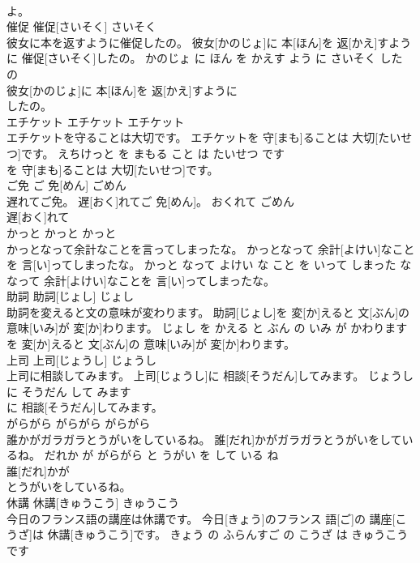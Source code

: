 \documentclass[8pt]{extreport}
\begin{document}
\begin{CJK}{UTF8}{min}
\\	よ。			
\\	催促	催促[さいそく]	さいそく	
\\	彼女に本を返すように催促したの。	彼女[かのじょ]に 本[ほん]を 返[かえ]すように 催促[さいそく]したの。	かのじょ に ほん を かえす よう に さいそく した の	
\\	彼女[かのじょ]に 本[ほん]を 返[かえ]すように
\\	したの。			
\\	エチケット	エチケット	エチケット	
\\	エチケットを守ることは大切です。	エチケットを 守[まも]ることは 大切[たいせつ]です。	えちけっと を まもる こと は たいせつ です	
\\	を 守[まも]ることは 大切[たいせつ]です。			
\\	ご免	ご 免[めん]	ごめん	
\\	遅れてご免。	遅[おく]れてご 免[めん]。	おくれて ごめん	
\\	遅[おく]れて
\\	かっと	かっと	かっと	
\\	かっとなって余計なことを言ってしまったな。	かっとなって 余計[よけい]なことを 言[い]ってしまったな。	かっと なって よけい な こと を いって しまった な	
\\	なって 余計[よけい]なことを 言[い]ってしまったな。			
\\	助詞	助詞[じょし]	じょし	
\\	助詞を変えると文の意味が変わります。	助詞[じょし]を 変[か]えると 文[ぶん]の 意味[いみ]が 変[か]わります。	じょし を かえる と ぶん の いみ が かわります	
\\	を 変[か]えると 文[ぶん]の 意味[いみ]が 変[か]わります。			
\\	上司	上司[じょうし]	じょうし	
\\	上司に相談してみます。	上司[じょうし]に 相談[そうだん]してみます。	じょうし に そうだん して みます	
\\	に 相談[そうだん]してみます。			
\\	がらがら	がらがら	がらがら	
\\	誰かがガラガラとうがいをしているね。	誰[だれ]かがガラガラとうがいをしているね。	だれか が がらがら と うがい を して いる ね	
\\	誰[だれ]かが
\\	とうがいをしているね。			
\\	休講	休講[きゅうこう]	きゅうこう	
\\	今日のフランス語の講座は休講です。	今日[きょう]のフランス 語[ご]の 講座[こうざ]は 休講[きゅうこう]です。	きょう の ふらんすご の こうざ は きゅうこう です	

\end{CJK}
\end{document}
